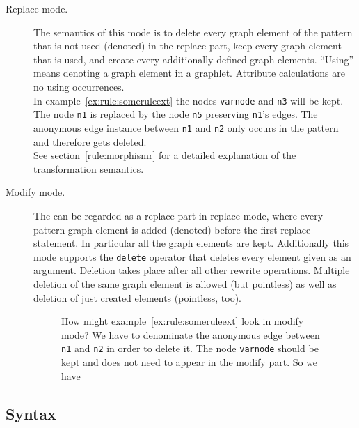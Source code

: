 \begin{description}
  \item[Replace mode.] The semantics of this mode is to delete every graph element of the pattern that is not used (denoted) in the replace part, keep every graph element that is used, and create every additionally defined graph elements. ``Using'' means denoting a graph element in a graphlet. Attribute calculations are no using occurrences.\\
  In example~\ref{ex:rule:someruleext} the nodes \texttt{varnode} and \texttt{n3} will be kept. The node \texttt{n1} is replaced by the node \texttt{n5} preserving \texttt{n1}'s edges. The anonymous edge instance between \texttt{n1} and \texttt{n2} only occurs in the pattern and therefore gets deleted.\\
See section~\ref{rule:morphismr} for a detailed explanation of the transformation semantics. 
  \item[Modify mode.] The  can be regarded as a replace part in replace mode, where every pattern graph element is added (denoted) before the first replace statement. 
In particular all the  graph elements are kept. 
Additionally this mode supports the \texttt{delete} operator that deletes every element given as an argument. 
Deletion takes place after all other rewrite operations. Multiple deletion of the same graph element is allowed (but pointless) as well as deletion of just created elements (pointless, too).
\begin{figure}[htbp]
\begin{example}
How might example~\ref{ex:rule:someruleext} look in modify mode? 
We have to denominate the anonymous edge between \texttt{n1} and \texttt{n2} in order to delete it. 
The node \texttt{varnode} should be kept and does not need to appear in the modify part. 
So we have
\begin{grgen}
rule SomeRuleExtModify(varnode: Node): (Node, EdgeTypeB)  {
  pattern {
    ...
    n1 -e0:Edge-> n2;
    ...
  }
  modify {
    n5 : NodeTypeC<n1>;
    n3 -e1:EdgeTypeB-> n5;
    delete(e0);
    eval {
      ...
\end{grgen}
\end{example}
\end{figure}
\end{description}

\subsection{Syntax}

